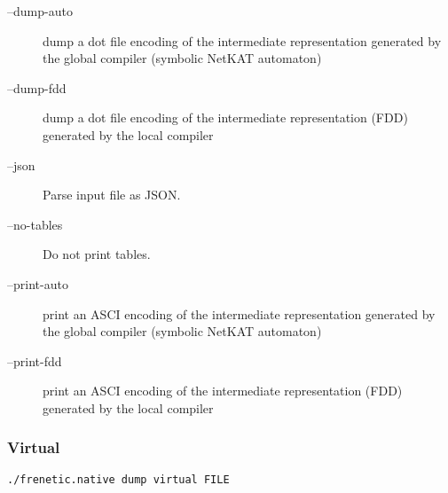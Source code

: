 \begin{description}
\item[--dump-auto]   dump a dot file encoding of the intermediate representation
                  generated by the global compiler (symbolic NetKAT automaton)
\item[--dump-fdd]    dump a dot file encoding of the intermediate representation
                  (FDD) generated by the local compiler
\item[--json]        Parse input file as JSON.
\item[--no-tables]   Do not print tables.
\item[--print-auto]  print an ASCI encoding of the intermediate representation
                  generated by the global compiler (symbolic NetKAT automaton)
\item[--print-fdd]   print an ASCI encoding of the intermediate representation
                  (FDD) generated by the local compiler
\end{description}

\subsubsection{Virtual}

\begin{verbatim}
./frenetic.native dump virtual FILE
\end{verbatim}

